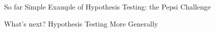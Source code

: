 \documentclass[handout]{beamer}
\begin{document}
%
%
%

\begin{frame}
\begin{block}{So far}
Simple Example of Hypothesis Testing: the Pepsi Challenge
\end{block}

\begin{block}{What's next?}
Hypothesis Testing More Generally
\end{block}

\end{frame}
\end{document}

